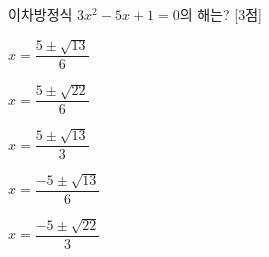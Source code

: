 이차방정식 $3x^2-5x+1=0$의 해는? \mbox{[3점]}
\begin{choices32}{\rule[-3ex]{0pt}{8ex}$x=\dfrac{5\pm\sqrt{13}}{6}$}{\rule[-3ex]{0pt}{8ex}$x=\dfrac{5\pm\sqrt{22}}{6}$}{\rule[-3ex]{0pt}{8ex}$x=\dfrac{5\pm\sqrt{13}}{3}$}{\rule[-3ex]{0pt}{8ex}$x=\dfrac{-5\pm\sqrt{13}}{6}$}{\rule[-3ex]{0pt}{8ex}$x=\dfrac{-5\pm\sqrt{22}}{3}$}\end{choices32}
